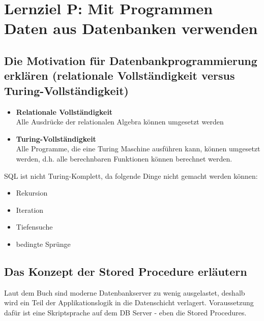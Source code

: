 \section{Lernziel P: Mit Programmen Daten aus Datenbanken verwenden}

\subsection{Die Motivation für Datenbankprogrammierung erklären (relationale Vollständigkeit versus Turing-Vollständigkeit)}

\begin{itemize}
    \item \textbf{Relationale Vollständigkeit} \\
    Alle Ausdrücke der relationalen Algebra können umgesetzt werden
    \item \textbf{Turing-Vollständigkeit} \\
    Alle Programme, die eine Turing Maschine ausführen kann, können umgesetzt werden, d.h. alle berechnbaren Funktionen können berechnet werden.
\end{itemize}

SQL ist nicht Turing-Komplett, da folgende Dinge nicht gemacht werden können:

\begin{itemize}
    \item Rekursion
    \item Iteration
    \item Tiefensuche
    \item bedingte Sprünge
\end{itemize}

\subsection{Das Konzept der Stored Procedure erläutern}

Laut dem Buch sind moderne Datenbankserver zu wenig ausgelastet, deshalb wird ein Teil der Applikationslogik in die Datenschicht verlagert. Voraussetzung dafür ist eine Skriptsprache auf dem DB Server - eben die Stored Procedures.

